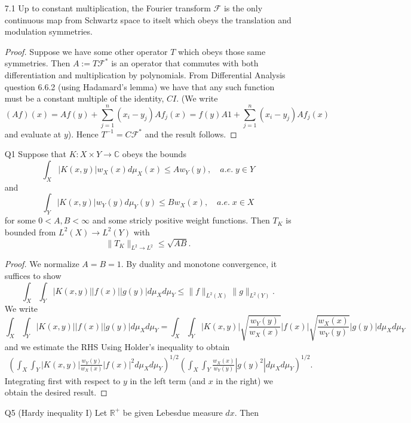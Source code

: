 \documentclass[11pt]{article}
\theoremstyle{remark}
\newcommand{\1}{\textbf{1}}
\def\norm#1{\| #1  \|}
\newcommand{\bbR}{\mathbb{R}}
\newcommand{\bbC}{\mathbb{C}}
\begin{document}
\begin{enumerate}
\begin{proof}
\[
|f * g (x) - f_\epsilon * g_ \epsilon (x)|  < \epsilon
\]
for all $x$. Thus the statement about decay at infinity follows from the fact that $f_\epsilon * g_\epsilon$ vanish outside a compact set.
\end{proof}
\item[7.1] Up to constant multiplication, the Fourier transform $\mathcal{F}$ is the only continuous map from Schwartz space to itselt which obeys the translation and modulation symmetries.
\begin{proof}
Suppose we have some other operator $T$ which obeys those same symmetries. Then $A:= T \mathcal{F}^{*}$ is an operator that commutes with both differentiation and multiplication by polynomials. From Differential Analysis question 6.6.2 (using Hadamard's lemma) we have that any such function must be a constant multiple of the identity, $CI$. (We write
\[
(Af) (x) = Af(y) + \sum_{j=1}^n (x_i - y_j) Af_j(x) = f(y) A1 + \sum_{j=1}^n (x_i - y_j) Af_j(x)
\]
and evaluate at $y$). Hence $T^{-1} = C \mathcal{F}^*$ and the result follows.
\end{proof}
\item[Q1] Suppose that $K : X \times Y \to \bbC$ obeys the bounds
\[
\int_X |K(x,y)| w_X(x) d\mu_X (x) \leq A w_Y(y), \quad a.e.\;y \in Y
\]
and
\[
\int_Y |K(x,y)| w_Y(y) d\mu_Y (y) \leq B w_X(x), \quad a.e.\;x \in X
\]
for some $0<A, B<\infty$ and some stricly positive weight functions. Then $T_K$ is bounded from $L^2(X) \to L^2(Y)$ with 
\[
\norm{T_K}_{L^2 \to L^2} \leq \sqrt{AB}.
\]
\begin{proof}
We normalize $A = B = 1$. By duality and monotone convergence, it suffices to show
\[
\int_X \int_Y |K(x,y)| |f(x)| |g(y)| d\mu_X d\mu_Y \leq \norm{f}_{L^2(X)} \norm{g}_{L^2(Y)}.
\]
We write
\[
\int_X \int_Y |K(x,y)| |f(x)| |g(y)| d\mu_X d\mu_Y = \int_X \int_Y   |K(x,y)| \sqrt{\frac{w_Y(y)}{w_X(x)}} |f(x)| \sqrt{\frac{w_X(x)}{w_Y(y)}} |g(y)| d\mu_X d\mu_Y
\]
and we estimate the RHS Using Holder's inequality to obtain
\begin{align*}
\left( \int_X \int_Y   |K(x,y)| \frac{w_Y(y)}{w_X(x)} |f(x)|^2 d\mu_X d\mu_Y \right)^{1/2} \left(\int_X \int_Y \frac{w_X(x)}{w_Y(y)} |g(y)^2|  d\mu_X d\mu_Y \right)^{1/2}.
\end{align*}
Integrating first with respect to $y$ in the left term (and $x$ in the right) we obtain the desired result.
\end{proof}
\item[Q5] (Hardy inequality I) Let $\bbR^+$ be given Lebesdue measure $dx$. Then

\end{enumerate}
\end{document}
